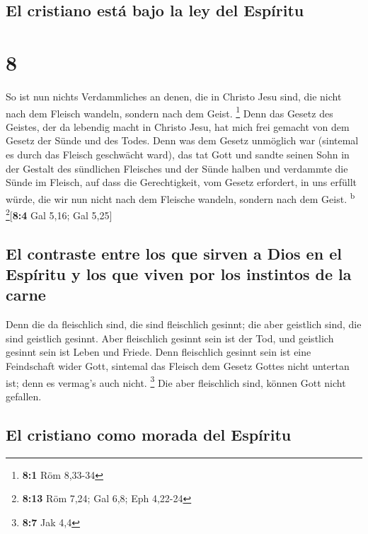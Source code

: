 \hypertarget{el-cristiano-estuxe1-bajo-la-ley-del-espuxedritu}{%
\subsection{El cristiano está bajo la ley del
Espíritu}\label{el-cristiano-estuxe1-bajo-la-ley-del-espuxedritu}}

\hypertarget{section-7}{%
\section{8}\label{section-7}}

 So ist nun nichts Verdammliches an denen, die in Christo
Jesu sind, die nicht nach dem Fleisch wandeln, sondern nach dem Geist.
\footnote{\textbf{8:1} Röm 8,33-34}  Denn das Gesetz des
Geistes, der da lebendig macht in Christo Jesu, hat mich frei gemacht
von dem Gesetz der Sünde und des Todes.  Denn was dem
Gesetz unmöglich war (sintemal es durch das Fleisch geschwächt ward),
das tat Gott und sandte seinen Sohn in der Gestalt des sündlichen
Fleisches und der Sünde halben und verdammte die Sünde im Fleisch,
 auf dass die Gerechtigkeit, vom Gesetz erfordert, in uns
erfüllt würde, die wir nun nicht nach dem Fleische wandeln, sondern nach
dem Geist. \textsuperscript{b} \footnote{\textbf{8:13} Röm 7,24; Gal
  6,8; Eph 4,22-24}{[}\textbf{8:4} Gal 5,16; Gal 5,25{]}

\hypertarget{el-contraste-entre-los-que-sirven-a-dios-en-el-espuxedritu-y-los-que-viven-por-los-instintos-de-la-carne}{%
\subsection{El contraste entre los que sirven a Dios en el Espíritu y
los que viven por los instintos de la
carne}\label{el-contraste-entre-los-que-sirven-a-dios-en-el-espuxedritu-y-los-que-viven-por-los-instintos-de-la-carne}}

 Denn die da fleischlich sind, die sind fleischlich
gesinnt; die aber geistlich sind, die sind geistlich gesinnt.
 Aber fleischlich gesinnt sein ist der Tod, und geistlich
gesinnt sein ist Leben und Friede.  Denn fleischlich
gesinnt sein ist eine Feindschaft wider Gott, sintemal das Fleisch dem
Gesetz Gottes nicht untertan ist; denn es vermag's auch nicht.
\footnote{\textbf{8:7} Jak 4,4}  Die aber fleischlich
sind, können Gott nicht gefallen.

\hypertarget{el-cristiano-como-morada-del-espuxedritu}{%
\subsection{El cristiano como morada del
Espíritu}\label{el-cristiano-como-morada-del-espuxedritu}}

